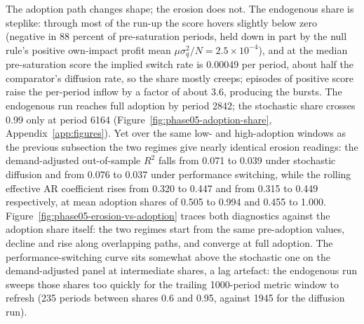 \documentclass[12pt]{article}
\begin{document}
The adoption path changes shape; the erosion does not. The endogenous share is steplike: through most of the run-up the score hovers slightly below zero (negative in 88 percent of pre-saturation periods, held down in part by the null rule's positive own-impact profit mean $\mu\sigma_q^{2}/N=2.5\times10^{-4}$), and at the median pre-saturation score the implied switch rate is 0.00049 per period, about half the comparator's diffusion rate, so the share mostly creeps; episodes of positive score raise the per-period inflow by a factor of about 3.6, producing the bursts. %
The endogenous run reaches full adoption by period 2842; the stochastic share crosses 0.99 only at period 6164 (Figure~\ref{fig:phase05-adoption-share}, Appendix~\ref{app:figures}). %
Yet over the same low- and high-adoption windows as the previous subsection the two regimes give nearly identical erosion readings: the demand-adjusted out-of-sample $R^{2}$ falls from 0.071 to 0.039 under stochastic diffusion and from 0.076 to 0.037 under performance switching, while the rolling effective AR coefficient rises from 0.320 to 0.447 and from 0.315 to 0.449 respectively, at mean adoption shares of 0.505 to 0.994 and 0.455 to 1.000. %
Figure~\ref{fig:phase05-erosion-vs-adoption} traces both diagnostics against the adoption share itself: the two regimes start from the same pre-adoption values, decline and rise along overlapping paths, and converge at full adoption. %
The performance-switching curve sits somewhat above the stochastic one on the demand-adjusted panel at intermediate shares, a lag artefact: the endogenous run sweeps those shares too quickly for the trailing 1000-period metric window to refresh (235 periods between shares 0.6 and 0.95, against 1945 for the diffusion run). %
\end{document}
